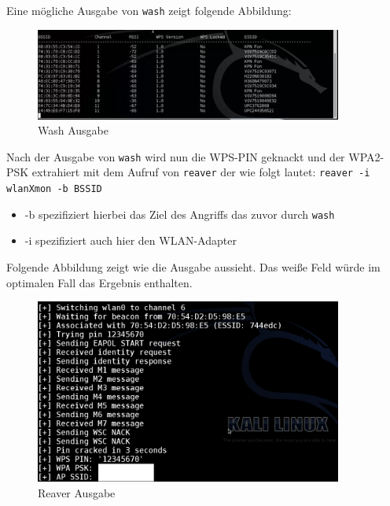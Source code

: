 		Eine mögliche Ausgabe von  \colorbox{altgray}{\lstinline|wash|} zeigt folgende Abbildung:
				\begin{figure}[H]
					\centering
					\includegraphics[width=0.9\textwidth]{images/WLAN/WashWPS.jpg}
					\caption{Wash Ausgabe}
					\label{fig:Wash Ausgabe}
				\end{figure}


	Nach der Ausgabe von \colorbox{altgray}{\lstinline|wash|} wird nun die WPS-PIN geknackt und der WPA2-PSK extrahiert mit dem Aufruf von \colorbox{altgray}{\lstinline|reaver|} der wie folgt lautet:
	\colorbox{altgray}{\lstinline|reaver -i wlanXmon -b BSSID|}
			\begin{itemize}
				\item -b spezifiziert hierbei das Ziel des Angriffs das zuvor durch \colorbox{altgray}{\lstinline|wash|}
				\item -i spezifiziert auch hier den WLAN-Adapter
			\end{itemize}

		Folgende Abbildung zeigt wie die Ausgabe aussieht. Das weiße Feld würde im optimalen Fall das Ergebnis enthalten.

						\begin{figure}[H]
							\centering
							\includegraphics[width=0.9\textwidth]{images/WLAN/reaver.png}
							\caption{Reaver Ausgabe}
							\label{fig:Reaver Ausgabe}
						\end{figure}

